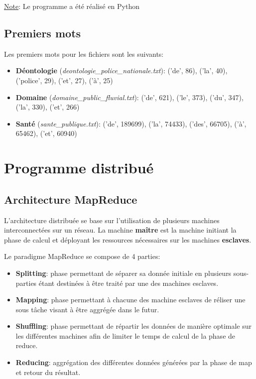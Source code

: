 \documentclass{article}
\begin{document}
\underline{Note}: Le programme a été réalisé en Python

\subsection{Premiers mots}
Les premiers mots pour les fichiers sont les suivants:

\begin{itemize}
    \item \textbf{Déontologie} (\textit{deontologie\_police\_nationale.txt}): ('de', 86), ('la', 40), ('police', 29), ('et', 27), ('à', 25)
    \item \textbf{Domaine} (\textit{domaine\_public\_fluvial.txt}): ('de', 621), ('le', 373), ('du', 347), ('la', 330), ('et', 266)
    \item \textbf{Santé} (\textit{sante\_publique.txt}): ('de', 189699), ('la', 74433), ('des', 66705), ('à', 65462), ('et', 60940)
\end{itemize}

\section{Programme distribué}
\subsection{Architecture MapReduce}
L'architecture distribuée se base sur l'utilisation de plusieurs machines interconnectées sur un réseau. La machine \textbf{maître} est la machine 
initiant la phase de calcul et déployant les ressources nécessaires sur les machines \textbf{esclaves}.

Le paradigme MapReduce se compose de 4 parties:
\begin{itemize}
    \item \textbf{Splitting}: phase permettant de séparer sa donnée initiale en plusieurs sous-parties étant destinées à être traité par une des machines esclaves.
    \item \textbf{Mapping}: phase permettant à chacune des machine esclaves de réliser une sous tâche visant à être aggrégée dans le futur.
    \item \textbf{Shuffling}: phase permettant de répartir les données de manière optimale sur les différentes machines afin de limiter le temps de calcul de la phase de reduce.
    \item \textbf{Reducing}: aggrégation des différentes données générées par la phase de map et retour du résultat.
\end{itemize}
\end{document}
